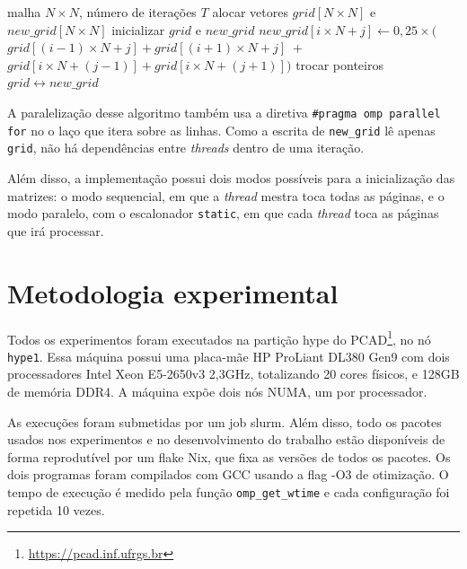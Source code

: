 \documentclass[12pt, letterpaper]{article}
\begin{document}
\begin{algorithm}[H]
	\caption{Stencil 2D de Jacobi}\label{alg:stencil}
	\begin{algorithmic}[1]
		\Require malha $N \times N$, número de iterações $T$
		\State alocar vetores $grid[N \times N]$ e $new\_grid[N \times N]$
		\State inicializar $grid$ e $new\_grid$
		\State $new\_grid[i \times N + j] \gets 0{,}25 \times ($
			\State \hspace{2em} $grid[(i-1) \times N + j] + grid[(i+1) \times N + j] \; +$
			\State \hspace{2em} $grid[i \times N + (j-1)] + grid[i \times N + (j+1)])$		\EndFor
		\EndFor
		\State trocar ponteiros $grid \leftrightarrow new\_grid$
		\EndFor
	\end{algorithmic}
\end{algorithm}

A paralelização desse algoritmo também usa a diretiva \texttt{\#pragma omp parallel for} no o laço que itera sobre as linhas. Como a escrita de \texttt{new\_grid} lê apenas \texttt{grid}, não há dependências entre \emph{threads} dentro de uma iteração.

Além disso, a implementação possui dois modos possíveis para a inicialização das matrizes: o modo sequencial, em que a \emph{thread} mestra toca todas as páginas, e o modo paralelo, com o escalonador \texttt{static}, em que cada \emph{thread} toca as páginas que irá processar.


\section{Metodologia experimental}
Todos os experimentos foram executados na partição hype do PCAD\footnote{\url{https://pcad.inf.ufrgs.br}}, no nó \texttt{hype1}. Essa máquina possui uma placa-mãe HP ProLiant DL380 Gen9 com dois processadores Intel Xeon E5-2650v3 2,3GHz, totalizando 20 cores físicos, e 128GB de memória DDR4. A máquina expõe dois nós NUMA, um por processador.

As execuções foram submetidas por um job slurm. Além disso, todo os pacotes usados nos experimentos e no desenvolvimento do trabalho estão disponíveis de forma reprodutível por um flake Nix, que fixa as versões de todos os pacotes. Os dois programas foram compilados com GCC usando a flag -O3 de otimização. O tempo de execução é medido pela função \texttt{omp\_get\_wtime} e cada configuração foi repetida 10 vezes.
\end{document}
